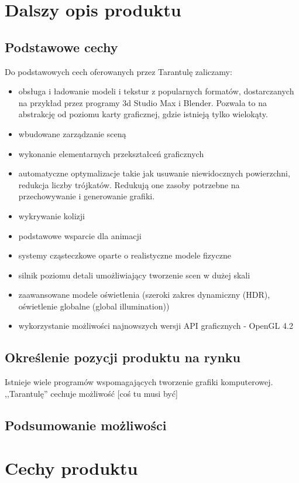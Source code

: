 \documentclass[11pt,leqno]{article}
\begin{document}
\section{Dalszy opis produktu}

\subsection{Podstawowe cechy}
Do podstawowych cech oferowanych przez Tarantulę zaliczamy:
\begin{itemize}
 \item obsługa i ładowanie modeli i tekstur z popularnych formatów, dostarczanych na przykład przez programy 3d Studio Max i Blender. 
 Pozwala to na abstrakcję od poziomu karty graficznej, gdzie istnieją tylko wielokąty.
  \item wbudowane zarządzanie sceną
\item wykonanie elementarnych przekształceń graficznych
\item automatyczne optymalizacje takie jak usuwanie niewidocznych powierzchni, redukcja liczby trójkatów. Redukują one zasoby potrzebne na przechowywanie i generowanie grafiki.
\item wykrywanie kolizji
\item podstawowe wsparcie dla animacji
\item systemy cząsteczkowe oparte o realistyczne modele fizyczne
\item silnik poziomu detali umożliwiający tworzenie scen w dużej skali
\item zaawansowane modele oświetlenia (szeroki zakres dynamiczny (HDR), oświetlenie globalne (global illumination))
\item wykorzystanie możliwości najnowszych wersji API graficznych  - OpenGL 4.2
\end{itemize}

\subsection{Określenie pozycji produktu na rynku}
Istnieje wiele programów wspomagających tworzenie grafiki komputerowej. ,,Tarantulę'' cechuje możliwość [coś tu musi być]

\subsection{Podsumowanie możliwości}


\section{Cechy produktu}
\end{document}
